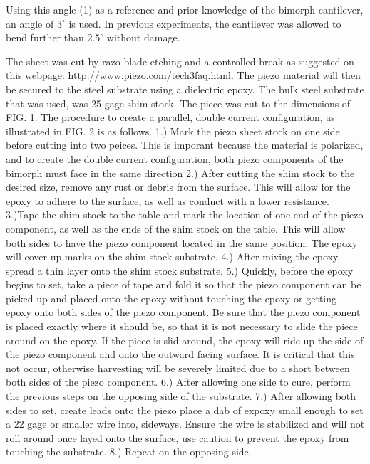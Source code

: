 \documentclass[aps,prl,twocolumn,groupedaddress]{revtex4}
\begin{document}
Using this angle (1) as a reference and prior knowledge of the bimorph cantilever, an angle of $3^\circ$ is used. In previous experiments, the cantilever was allowed to bend further than $2.5^\circ$ without damage. 

The sheet was cut by razo blade etching and a controlled break as suggested on this webpage: \url{http://www.piezo.com/tech3faq.html}. The piezo material will then be secured to the steel substrate using a dielectric epoxy. The bulk steel substrate that was used, was 25 gage shim stock. The piece was cut to the dimensions of FIG. 1. The procedure to create a parallel, double current configuration, as illustrated in FIG. 2 is as follows. 1.) Mark the piezo sheet stock on one side before cutting into two peices. This is imporant because the material is polarized, and to create the double current configuration, both piezo components of the bimorph must face in the same direction 2.) After cutting the shim stock to the desired size, remove any rust or debris from the surface. This will allow for the epoxy to adhere to the surface, as well as conduct with a lower resistance. 3.)Tape the shim stock to the table and mark the location of one end of the piezo component, as well as the ends of the shim stock on the table. This will allow both sides to have the piezo component located in the same position. The epoxy will cover up marks on the shim stock substrate. 4.) After mixing the epoxy, spread a thin layer onto the shim stock substrate. 5.) Quickly, before the epoxy begins to set, take a piece of tape and fold it so that the piezo component can be picked up and placed onto the epoxy without touching the epoxy or getting epoxy onto both sides of the piezo component. Be sure that the piezo component is placed exactly where it should be, so that it is not necessary to slide the piece around on the epoxy. If the piece is slid around, the epoxy will ride up the side of the piezo component and onto the outward facing surface. It is critical that this not occur, otherwise harvesting will be severely limited due to a short between both sides of the piezo component. 6.) After allowing one side to cure, perform the previous steps on the opposing side of the substrate. 7.) After allowing both sides to set, create leads onto the piezo place a dab of expoxy small enough to set a 22 gage or smaller wire into, sideways. Ensure the wire is stabilized and will not roll around once layed onto the surface, use caution to prevent the epoxy from touching the substrate. 8.) Repeat on the opposing side. 
\end{document}
